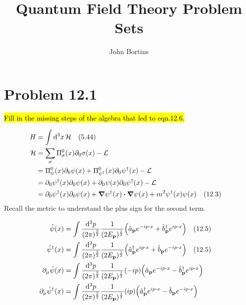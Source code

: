 \documentclass{article}
\title{Quantum Field Theory Problem Sets}
\author{John Bortins}
\begin{document}
\maketitle{}



\section*{Problem 12.1}
\begin{quoting}
    \hl{Fill in the missing steps of the algebra that led to eqn.12.6.}
\end{quoting}

\begin{align*}
    H           & =\int \dd[3]{x}\mathcal{H} \qq{(5.44)}                                                                                       \\
    \mathcal{H} & =\sum_\sigma \Pi^0_\sigma (x)\partial_0 \sigma(x)-\mathcal{L}                                                                \\
                & =\Pi^0_\psi (x)\partial_0 \psi(x)+\Pi^0_{\psi^\dagger} (x)\partial_0 \psi^\dagger(x)-\mathcal{L}                             \\
                & =\partial_0 \psi^\dagger(x)\partial_0 \psi(x)+\partial_0 \psi(x)\partial_0 \psi^\dagger(x)-\mathcal{L}                       \\
                & = \partial_0 \psi^\dagger (x)\partial_0 \psi(x)+\grad\psi^\dagger (x)\vdot\grad\psi(x)+m^2 \psi^\dagger(x)\psi(x)\qq{(12.3)} \\
\end{align*}
Recall the metric to understand the plus sign for the second term.

\begin{align*}
    \hat{\psi}(x)                       & =\int \frac{\dd[3]{p}}{(2\pi)^\frac{3}{2}}  \frac{1}{(2E_{\vb{p}})^{\frac{1}{2}}}  \pqty{\hat{a}_{\vb{p}}e^{-ip\vdot x}+\hat{b}^\dagger_{\vb{p}}e^{ip\vdot x}} \qq{(12.5)} \\
    \hat{\psi}^\dagger (x)              & =\int \frac{\dd[3]{p}}{(2\pi)^\frac{3}{2}}  \frac{1}{(2E_{\vb{p}})^{\frac{1}{2}}}  \pqty{\hat{a}^\dagger_{\vb{p}}e^{ip\vdot x}+\hat{b}_{\vb{p}}e^{-ip\vdot x}} \qq{(12.5)} \\
    \partial_\mu \hat{\psi}(x)          & =\int \frac{\dd[3]{p}}{(2\pi)^\frac{3}{2}}  \frac{1}{(2E_{\vb{p}})^{\frac{1}{2}}} (-ip) \pqty{\hat{a}_{\vb{p}}e^{-ip\vdot x}-\hat{b}^\dagger_{\vb{p}}e^{ip\vdot x}}        \\
    \partial_\mu \hat{\psi}^\dagger (x) & =\int \frac{\dd[3]{p}}{(2\pi)^\frac{3}{2}}  \frac{1}{(2E_{\vb{p}})^{\frac{1}{2}}} (ip) \pqty{\hat{a}^\dagger_{\vb{p}}e^{ip\vdot x}-\hat{b}_{\vb{p}}e^{-ip\vdot x}}         \\
\end{align*}
\end{document}
